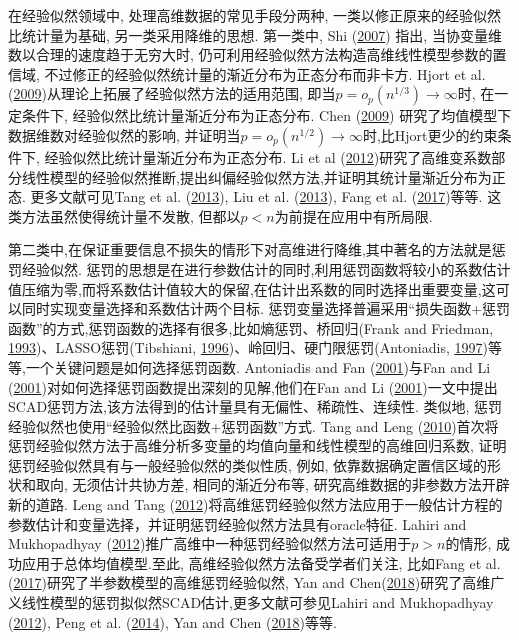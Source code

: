 \documentclass[cs4size]{article}
\def\link{\hyperlink}
\begin{document}
在经验似然领域中, 处理高维数据的常见手段分两种, 一类以修正原来的经验似然比统计量为基础, 另一类采用降维的思想. 第一类中, Shi (\link{Shi 2007}{2007}) 指出, 当协变量维数以合理的速度趋于无穷大时, 仍可利用经验似然方法构造高维线性模型参数的置信域, 不过修正的经验似然统计量的渐近分布为正态分布而非卡方. Hjort et al. (\link{Hjort et al. 2009}{2009})从理论上拓展了经验似然方法的适用范围, 即当$p=o_p(n^{1/3})\to \infty$时, 在一定条件下, 经验似然比统计量渐近分布为正态分布. Chen (\link{Chen 2009}{2009}) 研究了均值模型下数据维数对经验似然的影响, 并证明当$p=o_p (n^{1/2})→∞$时,比Hjort更少的约束条件下, 经验似然比统计量渐近分布为正态分布. Li et al (\link{Li et al. 2012}{2012})研究了高维变系数部分线性模型的经验似然推断,提出纠偏经验似然方法,并证明其统计量渐近分布为正态. 更多文献可见Tang et al. (\link{Tang et al. 2013}{2013}), Liu et al. (\link{Liu et al. 2013}{2013}), Fang et al. (\link{Fang et al. 2017}{2017})等等. 这类方法虽然使得统计量不发散, 但都以$p<n$为前提在应用中有所局限.

第二类中,在保证重要信息不损失的情形下对高维进行降维,其中著名的方法就是惩罚经验似然. 惩罚的思想是在进行参数估计的同时,利用惩罚函数将较小的系数估计值压缩为零,而将系数估计值较大的保留,在估计出系数的同时选择出重要变量,这可以同时实现变量选择和系数估计两个目标. 惩罚变量选择普遍采用“损失函数+惩罚函数”的方式,惩罚函数的选择有很多,比如熵惩罚、桥回归(Frank and Friedman, \link{Frank and Friedman 1993}{1993})、LASSO惩罚(Tibshiani, \link{Tibshiani 1996}{1996})、岭回归、硬门限惩罚(Antoniadis, \link{Antoniadis 1997}{1997})等等,一个关键问题是如何选择惩罚函数. Antoniadis and Fan (\link{Antoniadis and Fan 2001}{2001})与Fan and Li (\link{Fan and Li 2001}{2001})对如何选择惩罚函数提出深刻的见解,他们在Fan and Li (\link{Fan and Li 2001}{2001})一文中提出SCAD惩罚方法,该方法得到的估计量具有无偏性、稀疏性、连续性. 类似地, 惩罚经验似然也使用“经验似然比函数+惩罚函数”方式.  Tang and Leng (\link{Tang and Leng 2010}{2010})首次将惩罚经验似然方法于高维分析多变量的均值向量和线性模型的高维回归系数, 证明惩罚经验似然具有与一般经验似然的类似性质, 例如, 依靠数据确定置信区域的形状和取向, 无须估计共协方差, 相同的渐近分布等, 研究高维数据的非参数方法开辟新的道路. Leng and Tang (\link{Leng and Tang 2012}{2012})将高维惩罚经验似然方法应用于一般估计方程的参数估计和变量选择，并证明惩罚经验似然方法具有oracle特征. Lahiri and Mukhopadhyay (\link{Lahiri and Mukhopadhyay 2012}{2012})推广高维中一种惩罚经验似然方法可适用于$p>n$的情形, 成功应用于总体均值模型.至此, 高维经验似然方法备受学者们关注, 比如Fang et al. (\link{Fang et al. 2017}{2017})研究了半参数模型的高维惩罚经验似然, Yan and Chen(\link{Yan and Chen 2018}{2018})研究了高维广义线性模型的惩罚拟似然SCAD估计,更多文献可参见Lahiri and Mukhopadhyay (\link{Lahiri and Mukhopadhyay 2012}{2012}), Peng et al. (\link{Peng et al. 2014}{2014}), Yan and Chen (\link{Yan and Chen 2018}{2018})等等. 
\end{document}
